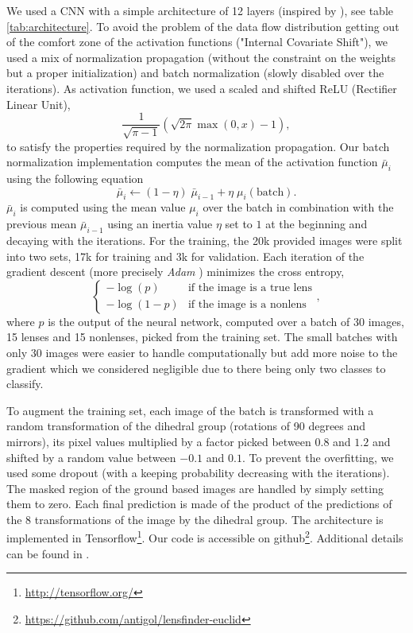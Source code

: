 \documentclass[useAMS,usenatbib]{mnras}
\begin{document}
We used a CNN \citep{Fukushima1980,Lecun1998} with a simple architecture of 12 layers (inspired by \citep{symmetry}), see table \ref{tab:architecture}.
To avoid the problem of the data flow distribution getting out of the comfort zone of the activation functions ("Internal Covariate Shift"), we used a mix of normalization propagation \citep{norm_prop} (without the constraint on the weights but a proper initialization) and batch normalization \citep{batch_norm} (slowly disabled over the iterations).
As activation function, we used a scaled and shifted ReLU (Rectifier Linear Unit), 
\begin{equation} \label{eq:relu}
    \frac{1}{\sqrt{\pi-1}} (\sqrt{2 \pi} \max(0,x) - 1),
\end{equation}
to satisfy the properties required by the normalization propagation.
Our batch normalization implementation computes the mean of the activation function $\bar\mu_i$ using the following equation 
\begin{equation} \label{eq:batchnorm}
    \bar\mu_i \longleftarrow (1-\eta) \; \bar\mu_{i-1} + \eta \; \mu_i(\text{batch}).
\end{equation}
$\bar\mu_i$ is computed using the mean value $\mu_i$ over the batch in combination with the previous mean $\bar\mu_{i-1}$ using an inertia value $\eta$ set to $1$ at the beginning and decaying with the iterations.
For the training, the 20k provided images were split into two sets, 17k for training and 3k for validation.
Each iteration of the gradient descent (more precisely \textit{Adam} \citep{adam}) minimizes the cross entropy, 
\begin{equation} \label{eq:xent}
    \left\{
    \begin{array}{ll}
        - \log(p)   & \text{if the image is a true lens} \\
        - \log(1-p) & \text{if the image is a nonlens}
    \end{array}
    \right.,
\end{equation}
where $p$ is the output of the neural network, computed over a batch of 30 images, 15 lenses and 15 nonlenses, picked from the training set.
The small batches with only 30 images were easier to handle computationally but add more noise to the gradient which we considered negligible due to there being only two classes to classify.

To augment the training set, each image of the batch is transformed with a random transformation of the dihedral group (rotations of 90 degrees and mirrors), its pixel values multiplied by a factor picked between $0.8$ and $1.2$ and shifted by a random value between $-0.1$ and $0.1$.
To prevent the overfitting, we used some dropout \citep{dropout} (with a keeping probability decreasing with the iterations).
The masked region of the ground based images are handled by simply setting them to zero.
Each final prediction is made of the product of the predictions of the 8 transformations of the image by the dihedral group.
The architecture is implemented in Tensorflow\footnote{\url{http://tensorflow.org/}}.
Our code is accessible on github\footnote{\url{https://github.com/antigol/lensfinder-euclid}}. Additional details can be found in \citet{2017Schaefer}.
\end{document}
